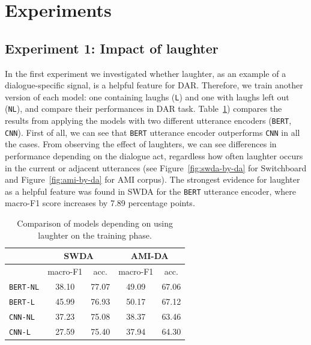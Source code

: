 \documentclass[11pt,a4paper]{article}
\begin{document}
\section{Experiments}
\subsection{Experiment 1: Impact of laughter} \label{sec:experiment1}   %
In the first experiment we investigated whether laughter, as an example of a dialogue-specific signal, is a helpful feature for DAR.
Therefore, we train another version of each model: one containing laughs (\texttt{L}) and one with laughs left out (\texttt{NL}), and compare their performances in DAR task.
Table~\ref{table:laughter-total-acc}) compares the results from applying the models with two different utterance encoders (\texttt{BERT}, \texttt{CNN}).
First of all, we can see that \texttt{BERT} utterance encoder outperforms \texttt{CNN} in all the cases.
From observing the effect of laughters, we can see differences in performance depending on the dialogue act, regardless how often laughter occurs in the current or adjacent utterances (see Figure~\ref{fig:swda-by-da} for Switchboard and Figure~\ref{fig:ami-by-da} for AMI corpus).
The strongest evidence for laughter as a helpful feature was found in SWDA for the \texttt{BERT} utterance encoder, where macro-F1 score increases by 7.89 percentage points.

\begin{table}
  \centering
  \begin{tabular}{@{}lcccc@{}}
    \toprule
                      & \multicolumn{2}{c}{SWDA} & \multicolumn{2}{c}{AMI-DA} \\ \midrule
                      & macro-F1 & acc. & macro-F1 & acc.       \\ 
    \texttt{BERT-NL}  & 38.10 & 77.07 & 49.09 & 67.06       \\ 
    \texttt{BERT-L}   & 45.99 & 76.93 & 50.17 & 67.12       \\ \midrule
    \texttt{CNN-NL}   & 37.23 & 75.08 & 38.37 & 63.46        \\
    \texttt{CNN-L}    & 27.59 & 75.40 & 37.94 & 64.30        \\ \bottomrule
    
  \end{tabular}
  \caption{Comparison of models depending on using laughter on the training phase. }
  \label{table:laughter-total-acc}
\end{table}
\end{document}
